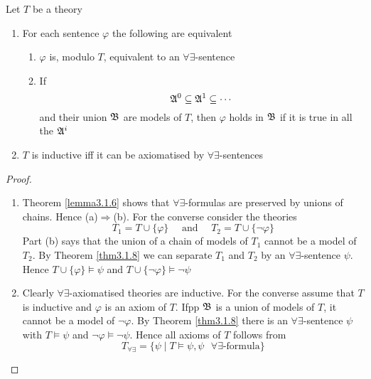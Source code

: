 \documentclass[11pt]{article}
\begin{document}
\begin{corollary}[]
Let \(T\) be a theory
\begin{enumerate}
\item For each sentence \(\varphi\) the following are equivalent
\begin{enumerate}
\item \(\varphi\) is, modulo \(T\), equivalent to an \(\forall\exists\)-sentence
\item If
\begin{equation*}
\mathfrak{A}^0\subseteq\mathfrak{A}^1\subseteq\cdots
\end{equation*}
and their union \(\mathfrak{B}\) are models of \(T\), then \(\varphi\) holds in \(\mathfrak{B}\) if
it is true in all the \(\mathfrak{A}^i\)
\end{enumerate}
\item \(T\) is inductive iff it can be axiomatised by \(\forall\exists\)-sentences
\end{enumerate}
\end{corollary}

\begin{proof}
\begin{enumerate}
\item Theorem \ref{lemma3.1.6} shows that \(\forall\exists\)-formulas are preserved
by unions of chains. Hence (a)\(\Rightarrow\)(b). For the converse
consider the theories
\begin{equation*}
T_1=T\cup\{\varphi\} \quad\text{ and }\quad T_2=T\cup\{\neg\varphi\}
\end{equation*}
Part (b) says that the union of a chain of models of \(T_1\) cannot be a
model of \(T_2\). By Theorem \ref{thm3.1.8} we can separate \(T_1\) and
\(T_2\) by an \(\forall\exists\)-sentence \(\psi\). Hence
\(T\cup\{\varphi\}\vDash\psi\) and
\(T\cup\{\neg\varphi\}\vDash\neg\psi\)
\item Clearly \(\forall\exists\)-axiomatised theories are inductive. For the
converse assume that \(T\) is inductive and \(\varphi\) is an axiom of \(T\). Ifpp
\(\mathfrak{B}\) is a union of models of \(T\), it cannot be a model of
\(\neg\varphi\). By Theorem \ref{thm3.1.8} there is an
\(\forall\exists\)-sentence \(\psi\) with \(T\vDash\psi\) and
\(\neg\varphi\vDash\neg\psi\). Hence all axioms of \(T\) follows from
\begin{equation*}
T_{\forall\exists}=\{\psi\mid T\vDash\psi,\psi\text{ $\forall\exists$-formula}\}
\end{equation*}
\end{enumerate}
\end{proof}
\end{document}
